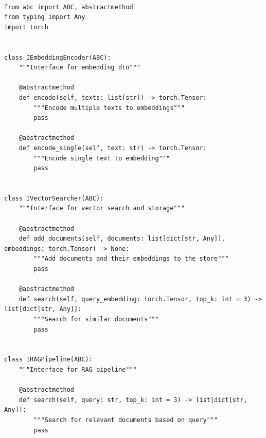 \begin{lstlisting}[basicstyle=\tiny\ttfamily,breaklines=true]

from abc import ABC, abstractmethod
from typing import Any
import torch


class IEmbeddingEncoder(ABC):
    """Interface for embedding dto"""

    @abstractmethod
    def encode(self, texts: list[str]) -> torch.Tensor:
        """Encode multiple texts to embeddings"""
        pass

    @abstractmethod
    def encode_single(self, text: str) -> torch.Tensor:
        """Encode single text to embedding"""
        pass


class IVectorSearcher(ABC):
    """Interface for vector search and storage"""

    @abstractmethod
    def add_documents(self, documents: list[dict[str, Any]], embeddings: torch.Tensor) -> None:
        """Add documents and their embeddings to the store"""
        pass

    @abstractmethod
    def search(self, query_embedding: torch.Tensor, top_k: int = 3) -> list[dict[str, Any]]:
        """Search for similar documents"""
        pass


class IRAGPipeline(ABC):
    """Interface for RAG pipeline"""

    @abstractmethod
    def search(self, query: str, top_k: int = 3) -> list[dict[str, Any]]:
        """Search for relevant documents based on query"""
        pass
\end{lstlisting}

